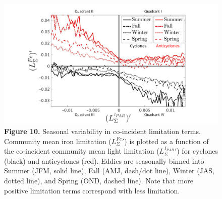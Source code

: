 
\begin{figure}[!htbp]
 \centering
 \begin{adjustwidth}{-1in}{-1in}
\includegraphics[scale=.6]{Fig11.pdf}
   \end{adjustwidth}
\caption[Seasonal variability in co-incident limitation terms. ]
{\textbf{Figure 10.} Seasonal variability in co-incident limitation terms. Community mean iron limitation ($L_\Sigma^{Fe}'$) is plotted as a function of the co-incident community mean light limitation ($L_\Sigma^{I_{PAR}}'$) for cyclones (black) and anticyclones (red). Eddies are seasonally binned into Summer (JFM, solid line), Fall (AMJ, dash/dot line), Winter (JAS, dotted line), and Spring (OND, dashed line). Note that more positive limitation terms correspond with less limitation. 
}
\label{fig:Fig10}
\end{figure}






